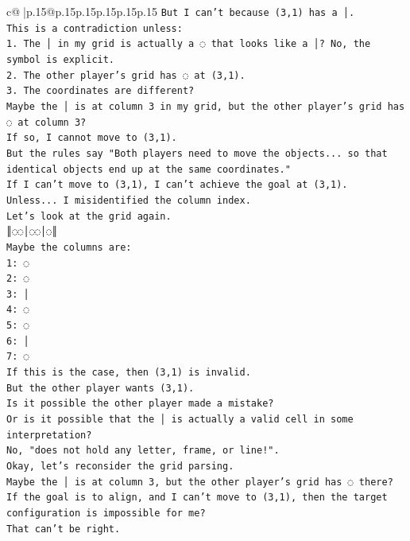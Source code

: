 \documentclass{article}
\begin{document}
{\begin{supertabular}{c@{$\;$}|p{.15\linewidth}@{}p{.15\linewidth}p{.15\linewidth}p{.15\linewidth}p{.15\linewidth}p{.15\linewidth}}
{{{\texttt{But I can't because (3,1) has a │.} \\
\texttt{This is a contradiction unless:} \\
\texttt{1. The │ in my grid is actually a ◌ that looks like a │? No, the symbol is explicit.} \\
\texttt{2. The other player's grid has ◌ at (3,1).} \\
\texttt{3. The coordinates are different?} \\
\texttt{Maybe the │ is at column 3 in my grid, but the other player's grid has ◌ at column 3?} \\
\texttt{If so, I cannot move to (3,1).} \\
\texttt{But the rules say "Both players need to move the objects... so that identical objects end up at the same coordinates."} \\
\texttt{If I can't move to (3,1), I can't achieve the goal at (3,1).} \\
\texttt{Unless... I misidentified the column index.} \\
\texttt{Let's look at the grid again.} \\
\texttt{║◌◌│◌◌│◌║} \\
\texttt{Maybe the columns are:} \\
\texttt{1: ◌} \\
\texttt{2: ◌} \\
\texttt{3: │} \\
\texttt{4: ◌} \\
\texttt{5: ◌} \\
\texttt{6: │} \\
\texttt{7: ◌} \\
\texttt{If this is the case, then (3,1) is invalid.} \\
\texttt{But the other player wants (3,1).} \\
\texttt{Is it possible the other player made a mistake?} \\
\texttt{Or is it possible that the │ is actually a valid cell in some interpretation?} \\
\texttt{No, "does not hold any letter, frame, or line!".} \\
\texttt{Okay, let's reconsider the grid parsing.} \\
\texttt{Maybe the │ is at column 3, but the other player's grid has ◌ there?} \\
\texttt{If the goal is to align, and I can't move to (3,1), then the target configuration is impossible for me?} \\
\texttt{That can't be right.} \\
}}}
\end{supertabular}}
\end{document}

